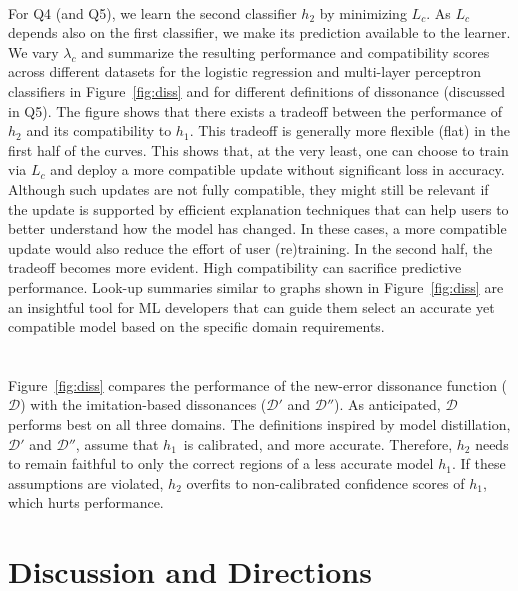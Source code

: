 \documentclass[letterpaper]{article}
\newcommand{\hone}{\mbox{$h_1$}}
\newcommand{\htwo}{\mbox{$h_2$}}
\newcommand{\loss}{L}
\newcommand{\lossbc}{\loss_c}
\newcommand{\lambdabc}{\lambda_c}
\newcommand{\dissonance}{\mathcal{D}}
\begin{document}
\\
\noindent For Q4 (and Q5), we learn the second classifier $\htwo$ by minimizing $\lossbc$. As $\lossbc$ depends also on the first classifier, we make its prediction available to the learner. We vary $\lambdabc$ and summarize the resulting performance and compatibility scores across different datasets for the logistic regression and multi-layer perceptron classifiers in Figure~\ref{fig:diss} and for different definitions of dissonance (discussed in Q5). 
The figure shows that there exists a tradeoff between the performance of $\htwo$ and its compatibility to $\hone$. This tradeoff is generally more flexible (flat) in the first half of the curves. This shows that, at the very least, one can choose to train via $\lossbc$ and deploy a more compatible update without significant loss in accuracy. Although such updates are not fully compatible, they might still be relevant if the update is supported by efficient explanation techniques that can help users to better understand how the model has changed. In these cases, a more compatible update would also reduce the effort of user (re)training. In the second half, the tradeoff becomes more evident. High compatibility can sacrifice predictive performance. Look-up summaries similar to graphs shown in Figure~\ref{fig:diss} are an insightful tool for ML developers that can guide them select an accurate yet compatible model based on the specific domain requirements. \\\\

\\
 Figure~\ref{fig:diss} compares the performance of the new-error dissonance function ($\dissonance$) with the imitation-based dissonances ($\dissonance'$  and  $\dissonance''$). As anticipated, $\dissonance$ performs  best on all  three domains. The definitions inspired by model distillation, $\dissonance'$ and $\dissonance''$,  assume that \hone\ is calibrated, and more accurate. Therefore, $\htwo$ needs to remain faithful to only the correct regions of a less accurate model $\hone$. If these assumptions are violated, $\htwo$ overfits to non-calibrated confidence scores of $\hone$, which hurts performance.


\section{Discussion and Directions}
\end{document}
